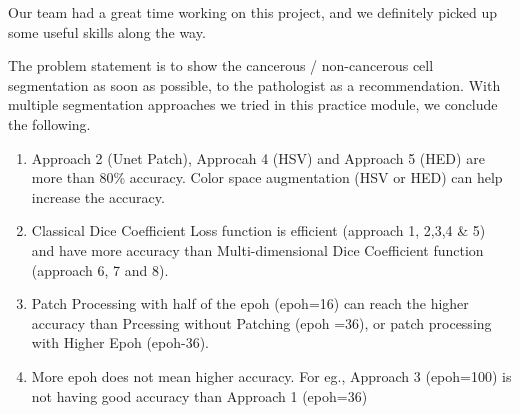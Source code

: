 \documentclass{article}
\begin{document}
	Our team had a great time working on this project, and we definitely picked up some useful skills along the way. 

	The problem statement is to show the cancerous / non-cancerous cell segmentation as soon as possible, to the pathologist as a recommendation. With multiple segmentation approaches we tried in this practice module, we conclude the following. 
\begin{enumerate}
\item Approach 2 (Unet Patch), Approcah 4 (HSV) and Approach 5 (HED) are more than 80\% accuracy. Color space augmentation (HSV or HED) can help increase the accuracy. 
\item Classical Dice Coefficient Loss function is efficient (approach 1, 2,3,4 & 5) and have more accuracy than Multi-dimensional Dice Coefficient function (approach 6, 7 and 8). 
\item Patch Processing with half of the epoh (epoh=16) can reach the higher accuracy than Prcessing without Patching (epoh =36), or patch processing with Higher Epoh (epoh-36).   
\item More epoh does not mean higher accuracy.  For eg., Approach 3 (epoh=100) is not having good accuracy than Approach 1 (epoh=36)
\end{enumerate}
\end{document}
